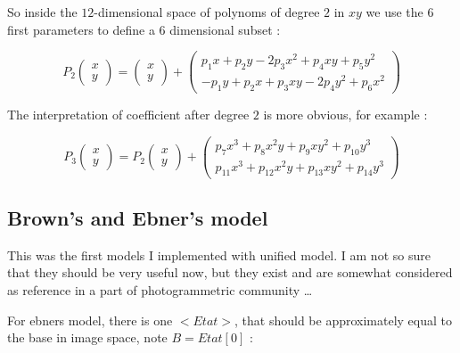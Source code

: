 So inside  the $12$-dimensional space of polynoms of degree $2$ in $xy$ we
use the $6$ first parameters to define a  $6$ dimensional subset :


\begin{equation}
   P_2 \begin{pmatrix}  x \\  y  \end{pmatrix}
   = \begin{pmatrix}  x \\  y  \end{pmatrix}
     + \begin{pmatrix}  p_1 x  + p_2 y -2 p_3 x^2  + p_4 xy + p_5 y^2
                     \\ -p_1y + p_2 x  + p_3 xy - 2 p_4 y^2 + p_6 x^2 \end{pmatrix}
\end{equation}


The interpretation of coefficient after degree $2$ is more obvious, for example :

\begin{equation}
   P_3 \begin{pmatrix}  x \\  y  \end{pmatrix}
   = P_2 \begin{pmatrix}  x \\  y  \end{pmatrix}
     +    \begin{pmatrix}  p_7 x^3 + p_8 x^2y + p_9 xy^2 + p_{10} y^3
                        \\  p_{11} x^3 + p_{12} x^2y + p_{13} xy^2 + p_{14} y^3   \end{pmatrix}
\end{equation}



\subsection{Brown's and Ebner's model}


This was the first models I implemented with unified model. I am not so sure that they
should be very useful now, but they exist and are somewhat considered as reference in a part
of photogrammetric community \dots


For ebners model, there is one $<Etat>$, that should be  approximately equal to the base in image space,
note $B=Etat[0]$ :

